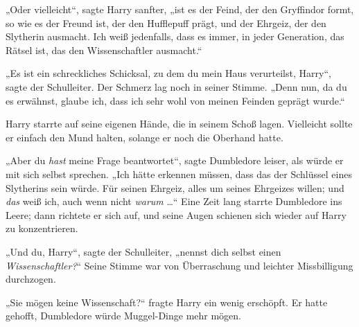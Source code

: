 „Oder vielleicht“, sagte Harry sanfter, „ist es der Feind, der den Gryffindor formt, so wie es der Freund ist, der den Hufflepuff prägt, und der Ehrgeiz, der den Slytherin ausmacht. Ich weiß jedenfalls, dass es immer, in jeder Generation, das Rätsel ist, das den Wissenschaftler ausmacht.“

„Es ist ein schreckliches Schicksal, zu dem du mein Haus verurteilst, Harry“, sagte der Schulleiter. Der Schmerz lag noch in seiner Stimme.
„Denn nun, da du es erwähnst, glaube ich, dass ich sehr wohl von meinen Feinden geprägt wurde.“

Harry starrte auf seine eigenen Hände, die in seinem Schoß lagen. Vielleicht sollte er einfach den Mund halten, solange er noch die Oberhand hatte.

„Aber du \emph{hast} meine Frage beantwortet“, sagte Dumbledore leiser, als würde er mit sich selbst sprechen.
„Ich hätte erkennen müssen, dass das der Schlüssel eines Slytherins sein würde. Für seinen Ehrgeiz, alles um seines Ehrgeizes willen; und \emph{das} weiß ich, auch wenn nicht \emph{warum} …“ Eine Zeit lang starrte Dumbledore ins Leere; dann richtete er sich auf, und seine Augen schienen sich wieder auf Harry zu konzentrieren.

„Und du, Harry“, sagte der Schulleiter, „nennst dich selbst einen \emph{Wissenschaftler?}“ Seine Stimme war von Überraschung und leichter Missbilligung durchzogen.

„Sie mögen keine Wissenschaft?“ fragte Harry ein wenig erschöpft. Er hatte gehofft, Dumbledore würde Muggel-Dinge mehr mögen.

